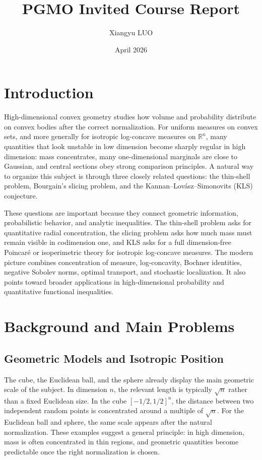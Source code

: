 \documentclass[10pt]{article}
\title{PGMO Invited Course Report}
\author{Xiangyu LUO}
\date{April 2026}
\begin{document}
\maketitle

\section{Introduction}

High-dimensional convex geometry studies how volume and probability distribute on convex bodies after the correct normalization. For uniform measures on convex sets, and more generally for isotropic log-concave measures on $\mathbb{R}^n$, many quantities that look unstable in low dimension become sharply regular in high dimension: mass concentrates, many one-dimensional marginals are close to Gaussian, and central sections obey strong comparison principles. A natural way to organize this subject is through three closely related questions: the thin-shell problem, Bourgain's slicing problem, and the Kannan--Lov\'asz--Simonovits (KLS) conjecture.

These questions are important because they connect geometric information, probabilistic behavior, and analytic inequalities. The thin-shell problem asks for quantitative radial concentration, the slicing problem asks how much mass must remain visible in codimension one, and KLS asks for a full dimension-free Poincar\'e or isoperimetric theory for isotropic log-concave measures. The modern picture combines concentration of measure, log-concavity, Bochner identities, negative Sobolev norms, optimal transport, and stochastic localization. It also points toward broader applications in high-dimensional probability and quantitative functional inequalities.

\section{Background and Main Problems}

\subsection{Geometric Models and Isotropic Position}

The cube, the Euclidean ball, and the sphere already display the main geometric scale of the subject. In dimension $n$, the relevant length is typically $\sqrt{n}$ rather than a fixed Euclidean size. In the cube $[-1/2,1/2]^n$, the distance between two independent random points is concentrated around a multiple of $\sqrt{n}$. For the Euclidean ball and sphere, the same scale appears after the natural normalization. These examples suggest a general principle: in high dimension, mass is often concentrated in thin regions, and geometric quantities become predictable once the right normalization is chosen.
\end{document}
